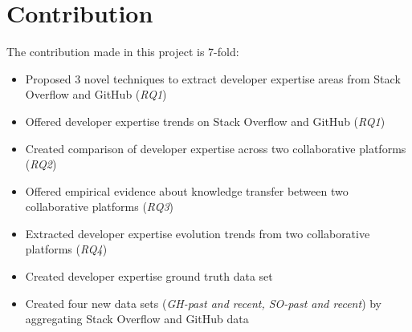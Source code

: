     \section{Contribution\label{sec:contribution}}
        The contribution made in this project is 7-fold:
        \begin{itemize}
            \item Proposed 3 novel techniques to extract developer expertise areas from Stack Overflow and GitHub (\emph{RQ1})
            \item Offered developer expertise trends on Stack Overflow and GitHub (\emph{RQ1})
            \item Created comparison of developer expertise across two collaborative platforms (\emph{RQ2})
            \item Offered empirical evidence about knowledge transfer between two collaborative platforms (\emph{RQ3})
            \item Extracted developer expertise evolution trends from two collaborative platforms (\emph{RQ4})
            \item Created developer expertise ground truth data set
            \item Created four new data sets (\emph{GH-past and recent, SO-past and recent}) by aggregating Stack Overflow and GitHub data
        \end{itemize}
    
    
